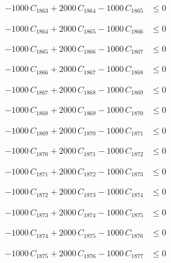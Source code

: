 \documentclass[a4paper,11pt]{article}
\begin{document}
\begin{align}
-1000\,C_{1863} + 2000\,C_{1864} - 1000\,C_{1865} &\leq 0 \nonumber
\end{align}

\begin{align}
-1000\,C_{1864} + 2000\,C_{1865} - 1000\,C_{1866} &\leq 0 \nonumber
\end{align}

\begin{align}
-1000\,C_{1865} + 2000\,C_{1866} - 1000\,C_{1867} &\leq 0 \nonumber
\end{align}

\begin{align}
-1000\,C_{1866} + 2000\,C_{1867} - 1000\,C_{1868} &\leq 0 \nonumber
\end{align}

\begin{align}
-1000\,C_{1867} + 2000\,C_{1868} - 1000\,C_{1869} &\leq 0 \nonumber
\end{align}

\begin{align}
-1000\,C_{1868} + 2000\,C_{1869} - 1000\,C_{1870} &\leq 0 \nonumber
\end{align}

\begin{align}
-1000\,C_{1869} + 2000\,C_{1870} - 1000\,C_{1871} &\leq 0 \nonumber
\end{align}

\begin{align}
-1000\,C_{1870} + 2000\,C_{1871} - 1000\,C_{1872} &\leq 0 \nonumber
\end{align}

\begin{align}
-1000\,C_{1871} + 2000\,C_{1872} - 1000\,C_{1873} &\leq 0 \nonumber
\end{align}

\begin{align}
-1000\,C_{1872} + 2000\,C_{1873} - 1000\,C_{1874} &\leq 0 \nonumber
\end{align}

\begin{align}
-1000\,C_{1873} + 2000\,C_{1874} - 1000\,C_{1875} &\leq 0 \nonumber
\end{align}

\begin{align}
-1000\,C_{1874} + 2000\,C_{1875} - 1000\,C_{1876} &\leq 0 \nonumber
\end{align}

\begin{align}
-1000\,C_{1875} + 2000\,C_{1876} - 1000\,C_{1877} &\leq 0 \nonumber
\end{align}
\end{document}
